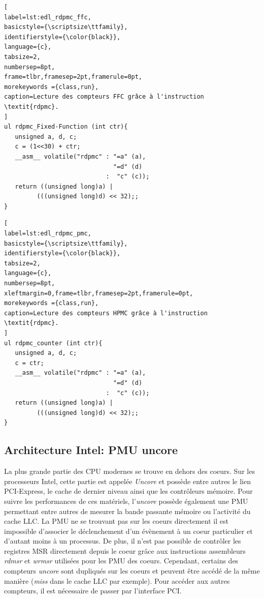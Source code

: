    
    

\begin{minipage}{.45\textwidth}
\begin{lstlisting}[
label=lst:edl_rdpmc_ffc,
basicstyle={\scriptsize\ttfamily},
identifierstyle={\color{black}},
language={c},
tabsize=2,
numbersep=8pt,
frame=tlbr,framesep=2pt,framerule=0pt,
morekeywords ={class,run},
caption=Lecture des compteurs FFC grâce à l'instruction \textit{rdpmc}.
]
ul rdpmc_Fixed-Function (int ctr){
   unsigned a, d, c;
   c = (1<<30) + ctr;
   __asm__ volatile("rdpmc" : "=a" (a), 
                              "=d" (d) 
                            :  "c" (c));
   return ((unsigned long)a) | 
         (((unsigned long)d) << 32);;
}
\end{lstlisting}
\end{minipage}%
\hfill
%
\begin{minipage}{.45\textwidth}
\begin{lstlisting}[
label=lst:edl_rdpmc_pmc,
basicstyle={\scriptsize\ttfamily},
identifierstyle={\color{black}},
tabsize=2,
language={c},
numbersep=8pt,
xleftmargin=0,frame=tlbr,framesep=2pt,framerule=0pt,
morekeywords ={class,run},
caption=Lecture des compteurs HPMC grâce à l'instruction \textit{rdpmc}.
]
ul rdpmc_counter (int ctr){
   unsigned a, d, c;
   c = ctr;
   __asm__ volatile("rdpmc" : "=a" (a),
                              "=d" (d)
                            :  "c" (c));
   return ((unsigned long)a) | 
         (((unsigned long)d) << 32);;
}
\end{lstlisting}
\end{minipage}




    \subsection{Architecture Intel: PMU uncore}\label{sec:edl_perf_uncore}
    
    
    La plus grande partie des CPU modernes se trouve en dehors des coeurs. Sur les processeurs Intel, cette partie est appelée \textit{Uncore} et possède entre autres le lien PCI-Express, le cache de dernier niveau ainsi que les contrôleurs mémoire. Pour suivre les performances de ces matériels, l'\textit{uncore} possède également une PMU permettant entre autres de mesurer la bande passante mémoire ou l'activité du cache LLC. La PMU ne se trouvant pas sur les coeurs directement il est impossible d'associer le déclenchement d'un évènement à un coeur particulier et d'autant moins à un processus. De plus, il n'est pas possible de contrôler les registres MSR directement depuis le coeur grâce aux instructions assembleurs \textit{rdmsr} et \textit{wrmsr} utilisées pour les PMU des coeurs. Cependant, certains des compteurs \textit{uncore} sont dupliqués sur les coeurs et peuvent être accédé de la même manière (\textit{miss} dans le cache LLC par exemple). Pour accéder aux autres compteurs, il est nécessaire de passer par l'interface PCI.
    
